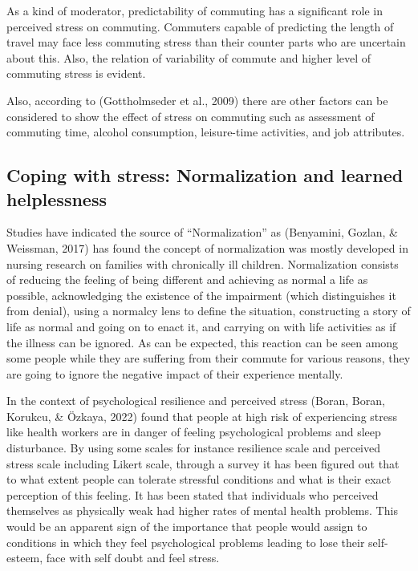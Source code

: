 \documentclass[
11pt, %
oneside, %
english, %
singlespacing, %
]{macthesis} %
\begin{document}
As a kind of moderator, predictability of commuting has a significant role in perceived stress on commuting. Commuters capable of predicting the length of travel may face less commuting stress than their counter parts who are uncertain about this. Also, the relation of variability of commute and higher level of commuting stress is evident.

Also, according to (Gottholmseder et al., 2009) there are other factors can be considered to show the effect of stress on commuting such as assessment of commuting time, alcohol consumption, leisure-time activities, and job attributes.

\hypertarget{coping-with-stress-normalization-and-learned-helplessness}{%
\subsection{Coping with stress: Normalization and learned helplessness}\label{coping-with-stress-normalization-and-learned-helplessness}}

Studies have indicated the source of ``Normalization'' as (Benyamini, Gozlan, \& Weissman, 2017) has found the concept of normalization was mostly developed in nursing research on families with chronically ill children. Normalization consists of reducing the feeling of being different and achieving as normal a life as possible, acknowledging the existence of the impairment (which distinguishes it from denial), using a normalcy lens to define the situation, constructing a story of life as normal and going on to enact it, and carrying on with life activities as if the illness can be ignored. As can be expected, this reaction can be seen among some people while they are suffering from their commute for various reasons, they are going to ignore the negative impact of their experience mentally.

In the context of psychological resilience and perceived stress (Boran, Boran, Korukcu, \& Özkaya, 2022) found that people at high risk of experiencing stress like health workers are in danger of feeling psychological problems and sleep disturbance. By using some scales for instance resilience scale and perceived stress scale including Likert scale, through a survey it has been figured out that to what extent people can tolerate stressful conditions and what is their exact perception of this feeling. It has been stated that individuals who perceived themselves as physically weak had higher rates of mental health problems. This would be an apparent sign of the importance that people would assign to conditions in which they feel psychological problems leading to lose their self-esteem, face with self doubt and feel stress.
\end{document}
